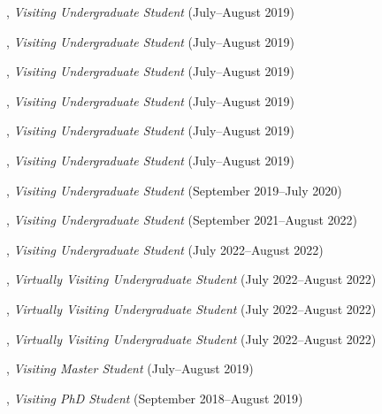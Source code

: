 \documentclass[10pt]{article}
\newenvironment{myindentpar}[1]%
{\begin{list}{}%
         {\setlength{\leftmargin}{#1}}%
         \item[]%
}
{\end{list}}
\newcounter{list}
\begin{document}
\begin{myindentpar}{0.75cm}
\hspace{-0.75cm}{\bf Xin Liu}, \textit{Visiting Undergraduate Student} (July--August 2019)

\hspace{-0.75cm}{\bf Wei Peng}, \textit{Visiting Undergraduate Student} (July--August 2019)

\hspace{-0.75cm}{\bf Ms. Mengxia Yu}, \textit{Visiting Undergraduate Student} (July--August 2019)

\hspace{-0.75cm}{\bf Ms. Kaifeng Yu}, \textit{Visiting Undergraduate Student} (July--August 2019)

\hspace{-0.75cm}{\bf Zhihan Zhang}, \textit{Visiting Undergraduate Student} (July--August 2019)

\hspace{-0.75cm}{\bf Ms. Yang Zhou}, \textit{Visiting Undergraduate Student} (July--August 2019)

\hspace{-0.75cm}{\bf Zaitang Li}, \textit{Visiting Undergraduate Student} (September 2019--July 2020)

\hspace{-0.75cm}{\bf Yunxiang Yan}, \textit{Visiting Undergraduate Student} (September 2021--August 2022)

\hspace{-0.75cm}{\bf Qi Liu}, \textit{Visiting Undergraduate Student} (July 2022--August 2022)

\hspace{-0.75cm}{\bf Xuan Zhang}, \textit{Virtually Visiting Undergraduate Student} (July 2022--August 2022)

\hspace{-0.75cm}{\bf Dong Liu}, \textit{Virtually Visiting Undergraduate Student} (July 2022--August 2022)

\hspace{-0.75cm}{\bf Yuchen Li}, \textit{Virtually Visiting Undergraduate Student} (July 2022--August 2022)

\hspace{-0.75cm}{\bf Zijian Hu}, \textit{Visiting Master Student} (July--August 2019)

\hspace{-0.75cm}{\bf Tianwen Jiang}, \textit{Visiting PhD Student} (September 2018--August 2019)

\end{myindentpar}
\end{document}
